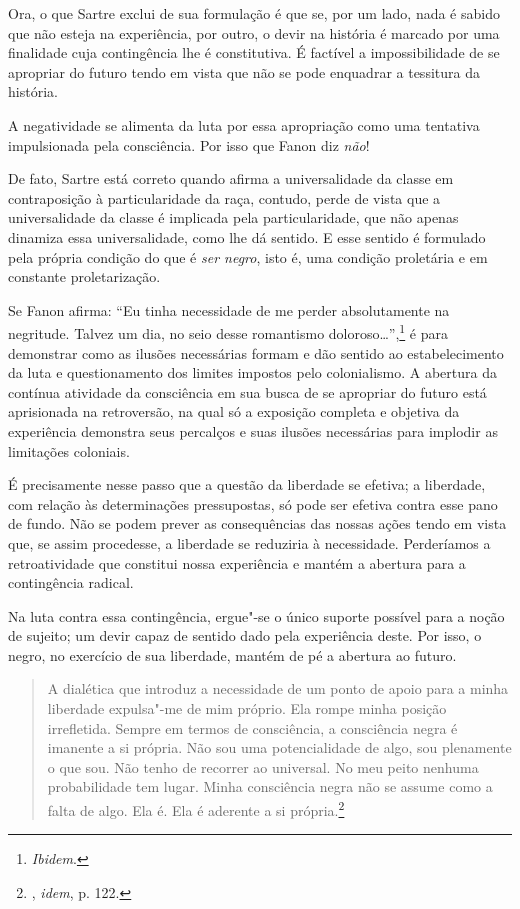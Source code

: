 Ora, o que Sartre exclui de sua formulação é que se, por um lado, nada é
sabido que não esteja na experiência, por outro, o devir na história é
marcado por uma finalidade cuja contingência lhe é constitutiva.
É factível a impossibilidade de
se apropriar do futuro tendo em vista que não se pode enquadrar a
tessitura da história.

A negatividade se alimenta da luta por essa apropriação como uma
tentativa impulsionada pela consciência. Por isso que Fanon diz
\emph{não}!

De fato, Sartre está correto quando afirma a universalidade da classe em
contraposição à particularidade da raça, contudo, perde de vista que a
universalidade da classe é implicada pela particularidade, que não
apenas dinamiza essa universalidade, como lhe dá sentido. E esse sentido
é formulado pela própria condição do que é \emph{ser negro}, isto é, uma
condição proletária e em constante proletarização.

Se Fanon afirma: ``Eu tinha necessidade de me perder absolutamente na
negritude. Talvez um dia, no seio desse romantismo
doloroso\ldots{}'',\footnote{\emph{Ibidem}.} é para demonstrar como as ilusões
necessárias formam e dão sentido ao estabelecimento da luta e
questionamento dos limites impostos pelo colonialismo. A abertura da
contínua atividade da consciência em sua busca de se apropriar do futuro
está aprisionada na retroversão, na qual só a exposição completa e
objetiva da experiência demonstra seus percalços e suas ilusões
necessárias para implodir as limitações coloniais.

É precisamente nesse passo que a questão da liberdade se efetiva; a
liberdade, com relação às determinações pressupostas, só pode ser
efetiva contra esse pano de fundo. Não se podem prever as consequências
das nossas ações tendo em vista que, se assim procedesse, a liberdade se
reduziria à necessidade. Perderíamos a retroatividade que constitui
nossa experiência e mantém a abertura para a contingência radical.

Na luta contra essa contingência, ergue"-se o único suporte possível para
a noção de sujeito; um devir capaz de sentido dado pela experiência
deste. Por isso, o negro, no exercício de sua liberdade, mantém de pé a
abertura ao futuro.

\begin{quote}
A dialética que introduz a necessidade de um ponto de apoio para a minha
liberdade expulsa"-me de mim próprio. Ela rompe minha posição
irrefletida. Sempre em termos de consciência, a consciência negra é
imanente a si própria. Não sou uma potencialidade de algo, sou
plenamente o que sou. Não tenho de recorrer ao universal. No meu peito
nenhuma probabilidade tem lugar. Minha consciência negra não se assume
como a falta de algo. Ela é. Ela é aderente a si própria.\footnote{,
  \emph{idem}, p. 122.}
\end{quote}

